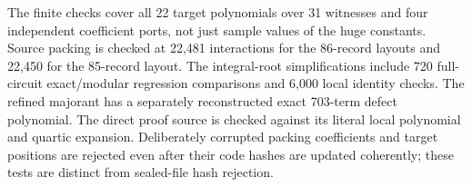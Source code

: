 The finite checks cover all 22 target polynomials over 31 witnesses and four independent coefficient ports, not just sample values of the huge constants. Source packing is checked at 22,481 interactions for the 86-record layouts and 22,450 for the 85-record layout. The integral-root simplifications include 720 full-circuit exact/modular regression comparisons and 6,000 local identity checks. The refined majorant has a separately reconstructed exact 703-term defect polynomial. The direct proof source is checked against its literal local polynomial and quartic expansion. Deliberately corrupted packing coefficients and target positions are rejected even after their code hashes are updated coherently; these tests are distinct from sealed-file hash rejection.
